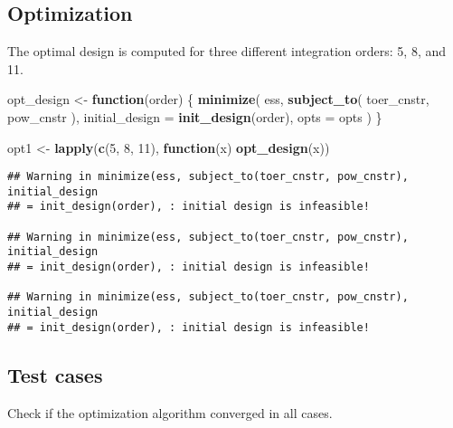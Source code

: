 \documentclass[]{book}
\newenvironment{Shaded}{\begin{snugshade}}{\end{snugshade}}
\newcommand{\ControlFlowTok}[1]{\textcolor[rgb]{0.13,0.29,0.53}{\textbf{#1}}}
\newcommand{\DataTypeTok}[1]{\textcolor[rgb]{0.13,0.29,0.53}{#1}}
\newcommand{\DecValTok}[1]{\textcolor[rgb]{0.00,0.00,0.81}{#1}}
\newcommand{\KeywordTok}[1]{\textcolor[rgb]{0.13,0.29,0.53}{\textbf{#1}}}
\newcommand{\NormalTok}[1]{#1}
\newcommand{\OperatorTok}[1]{\textcolor[rgb]{0.81,0.36,0.00}{\textbf{#1}}}
\newcommand{\StringTok}[1]{\textcolor[rgb]{0.31,0.60,0.02}{#1}}
\begin{document}
\hypertarget{optimization-9}{%
\subsection{Optimization}\label{optimization-9}}

The optimal design is computed for three different integration orders: 5, 8,
and 11.

\begin{Shaded}
\begin{Highlighting}[]
\NormalTok{opt_design <-}\StringTok{ }\ControlFlowTok{function}\NormalTok{(order) \{}
    \KeywordTok{minimize}\NormalTok{(}
\NormalTok{        ess,}
        \KeywordTok{subject_to}\NormalTok{(}
\NormalTok{            toer_cnstr,}
\NormalTok{            pow_cnstr}
\NormalTok{        ),}
        \DataTypeTok{initial_design =} \KeywordTok{init_design}\NormalTok{(order),}
        \DataTypeTok{opts =}\NormalTok{ opts}
\NormalTok{    )}
\NormalTok{\}}

\NormalTok{opt1 <-}\StringTok{ }\KeywordTok{lapply}\NormalTok{(}\KeywordTok{c}\NormalTok{(}\DecValTok{5}\NormalTok{, }\DecValTok{8}\NormalTok{, }\DecValTok{11}\NormalTok{), }\ControlFlowTok{function}\NormalTok{(x) }\KeywordTok{opt_design}\NormalTok{(x))}
\end{Highlighting}
\end{Shaded}

\begin{verbatim}
## Warning in minimize(ess, subject_to(toer_cnstr, pow_cnstr), initial_design
## = init_design(order), : initial design is infeasible!

## Warning in minimize(ess, subject_to(toer_cnstr, pow_cnstr), initial_design
## = init_design(order), : initial design is infeasible!

## Warning in minimize(ess, subject_to(toer_cnstr, pow_cnstr), initial_design
## = init_design(order), : initial design is infeasible!
\end{verbatim}

\hypertarget{test-cases-10}{%
\subsection{Test cases}\label{test-cases-10}}

Check if the optimization algorithm converged in all cases.

\begin{Shaded}
\end{Shaded}
\end{document}
